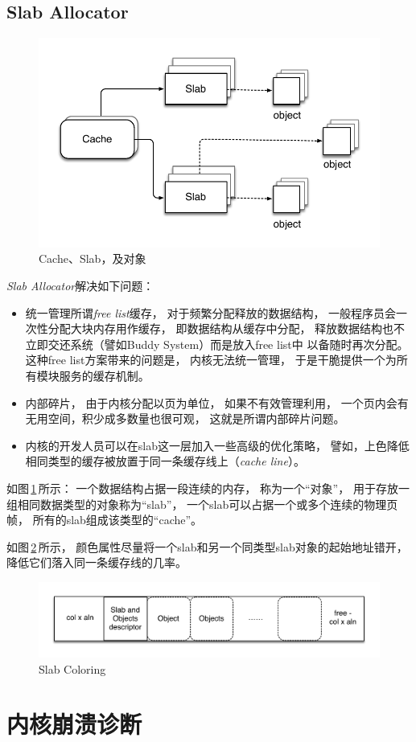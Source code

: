 \documentclass[11pt]{article}
\begin{document}
\subsection{Slab Allocator}
\begin{figure}[!ht]
\centering
\includegraphics[scale=0.8]{fig/slab}
\caption{Cache、Slab，及对象}
\label{fig:slab}
\end{figure}

{\em Slab Allocator}解决如下问题：
\begin{itemize}
  \item 统一管理所谓{\em free list}缓存，
    对于频繁分配释放的数据结构，
    一般程序员会一次性分配大块内存用作缓存，
    即数据结构从缓存中分配，
    释放数据结构也不立即交还系统（譬如Buddy System）而是放入free list中%
    以备随时再次分配。
    这种free list方案带来的问题是，
    内核无法统一管理，
    于是干脆提供一个为所有模块服务的缓存机制。

  \item 内部碎片，
    由于内核分配以页为单位，
    如果不有效管理利用，
    一个页内会有无用空间，积少成多数量也很可观，
    这就是所谓内部碎片问题。

  \item 内核的开发人员可以在slab这一层加入一些高级的优化策略，
    譬如，上色降低相同类型的缓存被放置于同一条缓存线上（{\em cache line}）。
\end{itemize}

如图\,\ref{fig:slab}\,所示：
一个数据结构占据一段连续的内存，
称为一个“对象”，
用于存放一组相同数据类型的对象称为“slab”，
一个slab可以占据一个或多个连续的物理页帧，
所有的slab组成该类型的“cache”。

如图\,\ref{fig:slabc}\,所示，
颜色属性尽量将一个slab和另一个同类型slab对象的起始地址错开，
降低它们落入同一条缓存线的几率。

\begin{figure}[!ht]
\centering
\includegraphics[scale=0.75]{fig/slab_color}
\caption{Slab Coloring}
\label{fig:slabc}
\end{figure}

\section{内核崩溃诊断}
\end{document}
